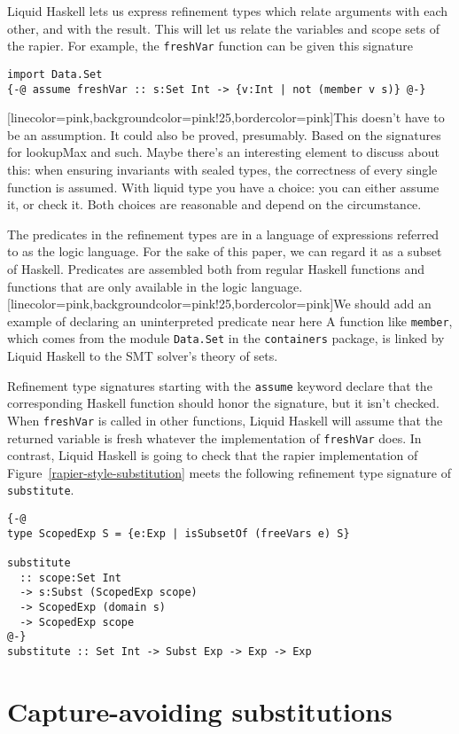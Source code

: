 \documentclass[sigconf, anonymous, review]{acmart}
\newcommand{\improvement}[1]{\todo[linecolor=pink,backgroundcolor=pink!25,bordercolor=pink]{#1}}
\renewcommand{\todo}{}
\newcommand{\improvement}[1]{{}}
\newcommand{\tc}[1]{{\small\texttt{#1}}}
\begin{document}
Liquid Haskell lets us express refinement types which relate arguments with each
other, and with the result. This will let us relate the variables and scope sets
of the rapier. For example, the \tc{freshVar} function can be given this signature

\begin{verbatim}
import Data.Set
{-@ assume freshVar :: s:Set Int -> {v:Int | not (member v s)} @-}
\end{verbatim}
\improvement{This doesn't have to be an assumption. It could also be proved,
  presumably. Based on the signatures for lookupMax and such. Maybe there's an
  interesting element to discuss about this: when ensuring invariants with sealed
  types, the correctness of every single function is assumed. With liquid type
  you have a choice: you can either assume it, or check it. Both choices are
  reasonable and depend on the circumstance.}

The predicates in the refinement types are in a language of expressions
referred to as the logic language. For the sake of this paper, we can
regard it as a subset of Haskell. Predicates are assembled both from
regular Haskell functions and functions that are
only available in the logic language.\improvement{We should add an example of
  declaring an uninterpreted predicate near here}
A function like \tc{member}, which comes from the module \tc{Data.Set}
in the \tc{containers} package, is linked by Liquid Haskell to the
SMT solver's theory of sets.

Refinement type signatures starting with the \tc{assume} keyword declare that the
corresponding Haskell function should honor the signature, but it isn't
checked. When \tc{freshVar} is called in other functions, Liquid Haskell
will assume that the returned variable is fresh whatever the implementation
of \tc{freshVar} does. In contrast, Liquid Haskell is going to check that
the rapier implementation of Figure~\ref{rapier-style-substitution} meets the
following refinement type signature of \tc{substitute}.

\begin{verbatim}
{-@
type ScopedExp S = {e:Exp | isSubsetOf (freeVars e) S}

substitute
  :: scope:Set Int
  -> s:Subst (ScopedExp scope)
  -> ScopedExp (domain s)
  -> ScopedExp scope
@-}
substitute :: Set Int -> Subst Exp -> Exp -> Exp
\end{verbatim}

\section{Capture-avoiding substitutions}
\label{capture-avoiding-substitution}
\end{document}
